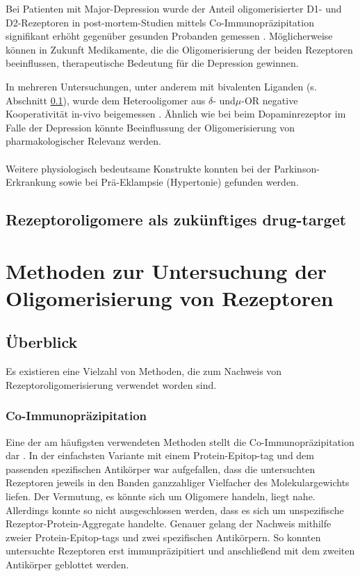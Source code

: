 Bei Patienten mit Major-Depression wurde der Anteil oligomerisierter D1- und D2-Rezeptoren in post-mortem-Studien mittels Co-Immunopräzipitation signifikant erhöht gegenüber gesunden Probanden gemessen \parencite{Pei2010}. Möglicherweise können in Zukunft Medikamente, die die Oligomerisierung der beiden Rezeptoren beeinflussen, therapeutische Bedeutung für die Depression gewinnen. 

In mehreren Untersuchungen, unter anderem mit bivalenten Liganden (s. Abschnitt \ref{drugs}), wurde dem Heterooligomer aus $\delta$- und$\mu$-OR negative Kooperativität in-vivo beigemessen \parencite{Daniels2005, Lenard2007, He2011}. Ähnlich wie bei beim Dopaminrezeptor im Falle der Depression könnte Beeinflussung der Oligomerisierung von pharmakologischer Relevanz werden.
\\ \\
Weitere physiologisch bedeutsame Konstrukte konnten bei der Parkinson-Erkrankung \parencite{Tanganelli2004, Fuxe2003, Fuxe2005} sowie bei Prä-Eklampsie (Hypertonie) \parencite{AbdAlla2001} gefunden werden.

\subsection{Rezeptoroligomere als zukünftiges drug-target}
\label{drugs}
\parencite{George2002, Hiller2013, Ferre2014}

\section{Methoden zur Untersuchung der Oligomerisierung von Rezeptoren}
\subsection{Überblick}
Es existieren eine Vielzahl von Methoden, die zum Nachweis von Rezeptoroligomerisierung verwendet worden sind. 

\subsubsection {Co-Immunopräzipitation}
Eine der am häufigsten verwendeten Methoden stellt die Co-Immunopräzipitation dar \parencite{Hebert1996, Jordan1999, Hillion2002, Park2004}. In der einfachsten Variante mit einem Protein-Epitop-tag und dem passenden spezifischen Antikörper war aufgefallen, dass die untersuchten Rezeptoren jeweils in den Banden ganzzahliger Vielfacher des Molekulargewichts liefen. Der Vermutung, es könnte sich um Oligomere handeln, liegt nahe. Allerdings konnte so nicht ausgeschlossen werden, dass es sich um unspezifische Rezeptor-Protein-Aggregate handelte. Genauer gelang der Nachweis mithilfe zweier Protein-Epitop-tags und zwei spezifischen Antikörpern. So konnten untersuchte Rezeptoren erst immunpräzipitiert und anschließend mit dem zweiten Antikörper geblottet werden.


